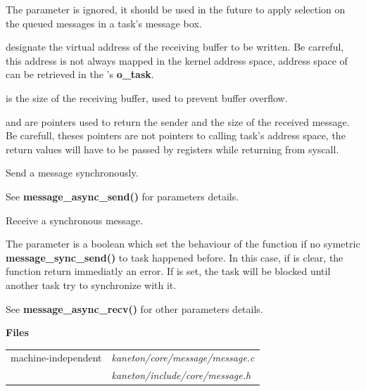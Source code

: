 \begin{itemize}
{	   \item The  parameter is ignored, it should be used in the
	   future to apply selection on the queued messages in a task's
	   message box.

	   \item {} designate the virtual address of the receiving
	   buffer to be written. Be carreful, this address is not always
	   mapped in the kernel address space, address space of 
	   can be retrieved in the 's \textbf{o\_task}.

	   \item {} is the size of the receiving buffer, used
	   to prevent buffer overflow.

	   \item {} and  are pointers used to
	   return the sender and the size of the received message. Be carefull,
	   theses pointers are not pointers to calling task's address space,
	   the return values will have to be passed by registers while
	   returning from syscall.
	 }

	 {
	   \item Send a message synchronously.

	   \item See \textbf{message\_async\_send()} for parameters details.
	 }

	 {
	   \item Receive a synchronous message.

	   \item The  parameter is a boolean which
	   set the behaviour of the function if no symetric
	   \textbf{message\_sync\_send()} to task 
	   happened before. In this case, if 
	   is clear, the function return immediatly an error.
	   If  is set, the task 
	   will be blocked until another task try to synchronize with it.

	   \item See \textbf{message\_async\_recv()} for other parameters
	   details.
	 }


  \item {\bf {Files}}\\

    \begin{tabular}{| l | l |}
      \hline
      machine-independent & {\em kaneton/core/message/message.c}\\
      &  {\em kaneton/include/core/message.h}\\\hline
    \end{tabular}
\end{itemize}

